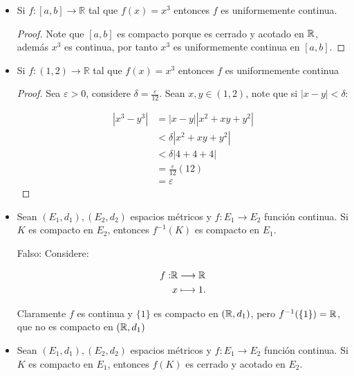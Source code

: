 \begin{itemize}[leftmargin=*]

\item  Si $f:[a, b] \rightarrow \mathbb{R}$ tal que $f(x)=x^3$ entonces $f$ es uniformemente continua.\\

\begin{proof}
Note que $[a,b]$ es compacto porque es cerrado y acotado en $\mathbb{R}$, además $x^3$ es continua, por tanto $x^3$ es uniformemente continua en $[a,b]$.
\end{proof}

\item Si $f:(1,2) \rightarrow \mathbb{R}$ tal que $f(x)=x^3$ entonces $f$ es uniformemente continua\\

 \begin{proof}
 Sea $\varepsilon>0$, considere $\delta=\frac{\varepsilon}{12}$. Sean $x,y \in (1,2)$, note que si $|x-y|<\delta$:

 \begin{align*}
    |x^3-y^3|&=|x-y||x^2+xy+y^2|\\
    &<\delta|x^2+xy+y^2|\\
    &<\delta|4+4+4|\\
    &=\frac{\varepsilon}{12}(12)\\
    &=\varepsilon
 \end{align*}
 \end{proof}    


\item  Sean $\left(E_1, d_1\right),\left(E_2, d_2\right)$ espacios métricos y $f: E_1 \rightarrow E_2$ función continua. Si $K$ es compacto en $E_2$, entonces $f^{-1}(K)$ es compacto en $E_1$.

Falso: Considere:

\begin{align*}
    f: &\mathbb{R} \longrightarrow \mathbb{R}\\
&\hspace*{0.05cm}x \longmapsto 1
.\end{align*}

Claramente $f$ es continua y $\{1\}$ es compacto en $(\mathbb{R},d_1)$, pero $f^{-1}(\{1\})=\mathbb{R}$, que no es compacto en $(\mathbb{R},d_1)$

\item Sean $\left(E_1, d_1\right),\left(E_2, d_2\right)$ espacios métricos y $f: E_1 \rightarrow E_2$ función continua. Si $K$ es compacto en $E_1$, entonces $f(K)$ es cerrado y acotado en $E_2$.\\


\end{itemize}
